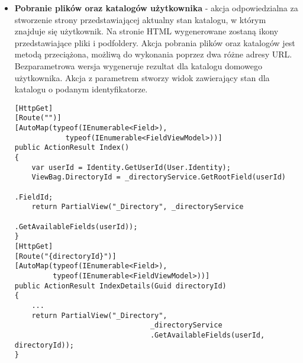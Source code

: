 \begin{itemize}
\begin{lstlisting}[caption=Metoda usuwania zaimplementowana w repozytorium danych]
public virtual void Delete(object id)
{
	TEntity entityToDelete = dbSet.Find(id);
	Delete(entityToDelete);
}
public virtual void Delete(TEntity entityToDelete)
{
	if(_context.Entry(entityToDelete).State== EntityState.Detached)
	{
		dbSet.Attach(entityToDelete);
	}
	dbSet.Remove(entityToDelete);
}
\end{lstlisting}

W celu odseparowania metod zbędnych dla niektórych repozytoriów zdecydowano się wykorzystać metody rozszerzeń w języku C\#
\begin{lstlisting}[caption=Klasa rozszerzająca metody możliwe do wykonania na repozytorium Katalogów]
public static class DirectoryExtensions
{
	public static IEnumerable<Field> GetFields(
									this Repository<Field> source,
							      Guid directoryId)
	{
		return source.Get(n => n.ParentDirectoryId == directoryId);
	}	
	public static Field GetFieldRoot(this Repository<Field> source,
												 Guid fieldId)
	{
		Field root = source.GetByID(fieldId);
		if (root == null)
		{
			throw new ArgumentException("There is no root folder");
		}           
		return root.ParentDirectoryId.HasValue
			 	 ? GetFieldRoot(source, root.ParentDirectoryId.Value)
			    : root;
	}
\end{lstlisting}
\item \textbf{Pobranie plików oraz katalogów użytkownika} - akcja odpowiedzialna za stworzenie strony przedstawiającej aktualny stan katalogu, w którym znajduje się użytkownik. Na stronie HTML wygenerowane zostaną ikony przedstawiające pliki i podfoldery. Akcja pobrania plików oraz katalogów jest metodą przeciążona, możliwą do wykonania poprzez dwa różne adresy URL. Bezparametrowa wersja wygeneruje rezultat dla katalogu domowego użytkownika. Akcja z parametrem stworzy widok zawierający stan dla katalogu o podanym identyfikatorze.
\begin{lstlisting}[caption=Akcje odpowiedzialne za wyświetlenie plików i katalogów na interfejsie użytkownika]
[HttpGet]
[Route("")]
[AutoMap(typeof(IEnumerable<Field>),
			typeof(IEnumerable<FieldViewModel>))]
public ActionResult Index()
{
	var userId = Identity.GetUserId(User.Identity);
	ViewBag.DirectoryId = _directoryService.GetRootField(userId)
																		.FieldId;
	return PartialView("_Directory", _directoryService
										.GetAvailableFields(userId));
}
[HttpGet]
[Route("{directoryId}")]
[AutoMap(typeof(IEnumerable<Field>),
		 typeof(IEnumerable<FieldViewModel>))]
public ActionResult IndexDetails(Guid directoryId)
{
	...
	return PartialView("_Directory", 
								_directoryService
								.GetAvailableFields(userId, directoryId));
}
\end{lstlisting}


\end{itemize}

